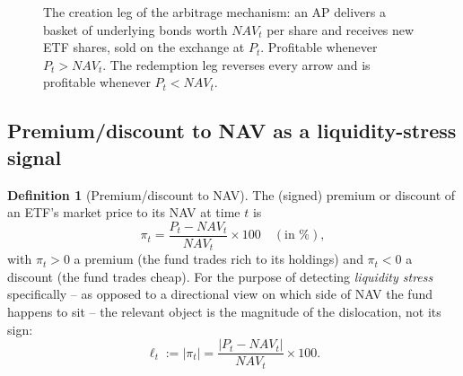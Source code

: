 \documentclass[11pt]{article}
\theoremstyle{definition}
\newtheorem{definition}[theorem]{Definition}
\theoremstyle{remark}
\begin{document}
\begin{figure}[H]
\centering
{}
\caption{The creation leg of the arbitrage mechanism: an AP delivers a basket of underlying bonds worth $NAV_t$ per share and receives new ETF shares, sold on the exchange at $P_t$. Profitable whenever $P_t>NAV_t$. The redemption leg reverses every arrow and is profitable whenever $P_t<NAV_t$.}
\label{fig:creation-redemption}
\end{figure}

\subsection{Premium/discount to NAV as a liquidity-stress signal}
\label{sec:premdisc}

\begin{definition}[Premium/discount to NAV]
The (signed) premium or discount of an ETF's market price to its NAV at time $t$ is
\[
\pi_t = \frac{P_t - NAV_t}{NAV_t} \times 100 \quad(\text{in \%}),
\]
with $\pi_t>0$ a premium (the fund trades rich to its holdings) and $\pi_t<0$ a discount (the fund trades cheap). For the purpose of detecting \emph{liquidity stress} specifically -- as opposed to a directional view on which side of NAV the fund happens to sit -- the relevant object is the magnitude of the dislocation, not its sign:
\[
\boxed{\ \ell_t := |\pi_t| = \frac{|P_t - NAV_t|}{NAV_t}\times 100.\ }
\]
\end{definition}
\end{document}
